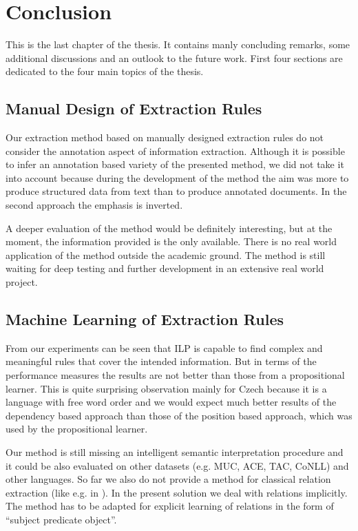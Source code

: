 \chapter{Conclusion} \label{sec:ch_conclusion}

This is the last chapter of the thesis. It contains manly concluding remarks, some additional discussions and an outlook to the future work. First four sections are dedicated to the four main topics of the thesis. 



\section{Manual Design of Extraction Rules}


Our extraction method based on manually designed extraction rules do not consider the annotation aspect of information extraction. Although it is possible to infer an annotation based variety of the presented method, we did not take it into account because during the development of the method the aim was more to produce structured data from text than to produce annotated documents. In the second approach the emphasis is inverted. 

A deeper evaluation of the method would be definitely interesting, but at the moment, the information provided is the only available. There is no real world application of the method outside the academic ground. The method is still waiting for deep testing and further development in an extensive real world project.



\section{Machine Learning of Extraction Rules}

From our experiments can be seen that ILP is capable to find complex and meaningful rules that cover the intended information. But in terms of the performance measures the results are not better than those from a propositional learner. This is quite surprising observation mainly for  Czech because it is a language with free word order and we would expect much better results of the dependency based approach than those of the position based approach, which was used by the propositional learner.

Our method is still missing an intelligent semantic interpretation procedure and it could be also evaluated on other datasets (e.g. MUC, ACE, TAC, CoNLL) and other languages. So far we also do not provide a method for classical relation extraction (like e.g. in \citep{Bunescu:DependencyPaths}). In the present solution we deal with relations implicitly. The method has to be adapted for explicit learning of relations in the form of ``subject predicate object''.

